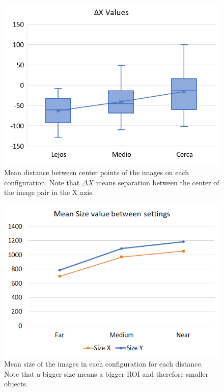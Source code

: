 \documentclass[10pt,a4paper,twocolumn,twoside]{article}
\begin{document}
	\begin{figure}
		\centering
		\includegraphics[width=1\linewidth]{img/fancydelta.png}
		\caption{Mean distance between center points of the images on each configuration. Note that $\Delta X$ means separation between the center of the image pair in the X axis.}
		\label{fig:ut:2:deltax}
	\end{figure}

	\begin{figure}
		\centering
		\includegraphics[width=1\linewidth]{img/userTestingSizechart.png}
		\caption{Mean size of the images in each configuration for each distance. Note that a bigger size means a bigger ROI and therefore smaller objects.}
		\label{fig:ut:2:size}
	\end{figure}
\end{document}
